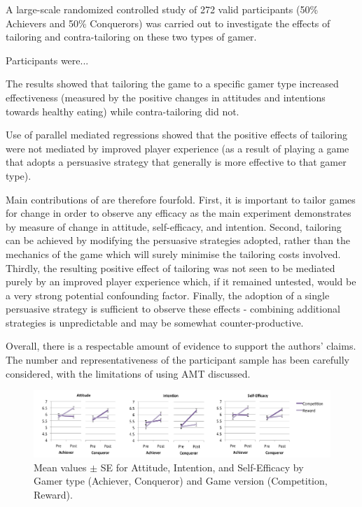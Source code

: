 \documentclass[11pt]{article}
\begin{document}
A large-scale randomized controlled study of 272 valid participants (50\% Achievers and 50\% Conquerors) was carried out to investigate the effects of tailoring and contra-tailoring on these two types of gamer. 

Participants were...

The results showed that tailoring the game to a specific gamer type increased effectiveness (measured by the positive changes in attitudes and intentions towards healthy eating) while contra-tailoring did not.

Use of parallel mediated regressions \citep{hayes2013} showed that the positive effects of tailoring were not mediated by improved player experience (as a result of playing a game that adopts a persuasive strategy that generally is more effective to that gamer type). 

Main contributions of \citet{orji2017} are therefore fourfold. First, it is important to tailor games for change in order to observe any efficacy as the main experiment demonstrates by measure of change in attitude, self-efficacy, and intention. Second, tailoring can be achieved by modifying the persuasive strategies adopted, rather than the mechanics of the game which will surely minimise the tailoring costs involved. 
Thirdly, the resulting positive effect of tailoring was not seen to be mediated purely by an improved player experience which, if it remained untested, would be a very strong potential confounding factor. Finally, the adoption of a single persuasive strategy is sufficient to observe these effects - combining additional strategies is unpredictable and may be somewhat counter-productive.

Overall, there is a respectable amount of evidence to support the authors' claims. The number and representativeness of the participant sample has been carefully considered, with the limitations of using AMT discussed.

\begin{figure}[H]
\centering
\includegraphics[width=\textwidth]{img/orji2017-tailoring-results.png} 
\caption{Mean values $\pm$ SE for Attitude, Intention, and Self-Efficacy by Gamer type (Achiever, Conqueror) and Game version (Competition, Reward).}\label{fig:orji2017-tailoring-results}
\end{figure}
\end{document}
